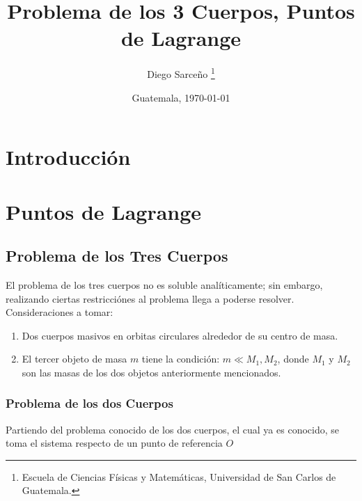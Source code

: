 







\title{\sc Problema de los 3 Cuerpos, Puntos de Lagrange}%
\author{Diego Sarceño \thanks{Escuela de Ciencias Físicas y Matemáticas,
  Universidad de San Carlos de Guatemala.}}
\date{Guatemala, \today}

  
\maketitle

\begin{abstract}
  \lipsum[1]
\end{abstract}


\section{Introducción}
\label{sec:intro}
\justify 
\lipsum[1]


\section{Puntos de Lagrange}
\subsection{Problema de los Tres Cuerpos}
\label{sec:Puntos de Lagrange}

El problema de los tres cuerpos no es soluble analíticamente; sin embargo, realizando ciertas restricciónes al problema llega a poderse resolver. Consideraciones a tomar:
\begin{enumerate}
	\item Dos cuerpos masivos en orbitas circulares alrededor de su centro de masa.
	\item El tercer objeto de masa $m$ tiene la condición: $m\ll M_1,M_2$, donde $M_1$ y $M_2$ son las masas de los dos objetos anteriormente mencionados.
\end{enumerate}

\subsubsection{Problema de los dos Cuerpos}
Partiendo del problema conocido de los dos cuerpos, el cual ya es conocido, se toma el sistema respecto de un punto de referencia $O$

